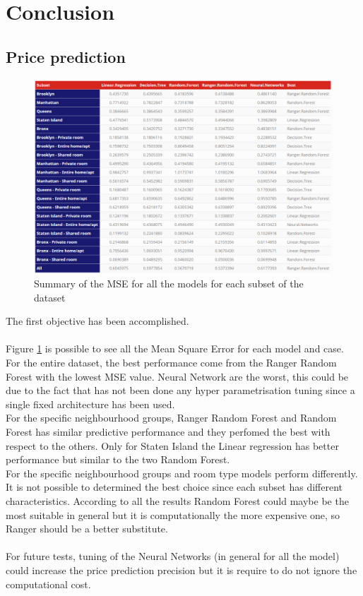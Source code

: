 \documentclass{FR16}
\begin{document}
\newpage



\section{Conclusion}
 
 
\subsection{Price prediction}
\begin{figure}[H]
\centering
\includegraphics[width=1\textwidth]{figures/model_summary.PNG} 
\caption{\label{fig:37} Summary of the MSE for all the models for each subset of the dataset }
\end{figure}
\newpage
\noindent The first objective has been accomplished. \\\\ Figure \ref{fig:37} is possible to see all the Mean Square Error for each model and case. \\
For the entire dataset, the best performance come from the Ranger Random Forest with the lowest MSE value. Neural Network are the worst, this could be due to the fact that has not been done any  hyper parametrisation tuning since a single fixed architecture has been used. 
\\
For the specific neighbourhood groups, Ranger Random Forest and Random Forest has similar predictive performance and they perfomed the best with respect to the others. Only for Staten Island the Linear regression has better performance but similar to the two Random Forest.
\\ 
For the specific neighbourhood groups and room type models perform differently. It is not possible to determined the best choice since each subset has different characteristics. According to all the results Random Forest could maybe be the most suitable in general but it is computationally the more expensive one, so Ranger should be a better substitute. 
\\\\
For future tests, tuning of the Neural Networks (in general for all the model) could increase the price prediction precision but it is require to do not ignore the computational cost.
\\\\
\end{document}
